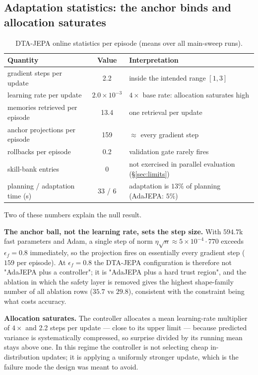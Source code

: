 \subsection{Adaptation statistics: the anchor binds and allocation saturates}

\begin{table}[t]
\centering
\caption{DTA-JEPA online statistics per episode (means over all main-sweep runs).}
\label{tab:stats}
\begin{tabular}{lcl}
\toprule
Quantity & Value & Interpretation \\
\midrule
gradient steps per update & 2.2 & inside the intended range $[1,3]$ \\
learning rate per update & $2.0\times10^{-3}$ & $4\times$ base rate: allocation saturates high \\
memories retrieved per episode & 13.4 & one retrieval per update \\
anchor projections per episode & 159 & $\approx$ every gradient step \\
rollbacks per episode & 0.2 & validation gate rarely fires \\
skill-bank entries & 0 & not exercised in parallel evaluation (\S\ref{sec:limits}) \\
planning / adaptation time (s) & 33 / 6 & adaptation is $13\%$ of planning (AdaJEPA: $5\%$) \\
\bottomrule
\end{tabular}
\end{table}

Two of these numbers explain the null result.

\textbf{The anchor ball, not the learning rate, sets the step size.} With $594.7$k fast
parameters and Adam, a single step of norm $\eta\sqrt{n} \approx 5\times10^{-4}\cdot 770$
exceeds $\epsilon_f = 0.8$ immediately, so the projection fires on essentially every gradient
step ($159$ per episode). At $\epsilon_f=0.8$ the DTA-JEPA configuration is therefore not
"AdaJEPA plus a controller"; it is "AdaJEPA plus a hard trust region", and the ablation in
which the safety layer is removed gives the highest shape-family number of all ablation rows
($35.7$ vs $29.8$), consistent with the constraint being what costs accuracy.

\textbf{Allocation saturates.} The controller allocates a mean learning-rate multiplier of
$4\times$ and 2.2 steps per update --- close to its upper limit --- because predicted variance
is systematically compressed, so surprise divided by its running mean stays above one. In this
regime the controller is not selecting cheap in-distribution updates; it is applying a
uniformly stronger update, which is the failure mode the design was meant to avoid.

